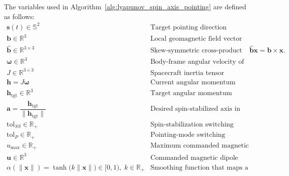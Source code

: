 \documentclass[conference,onecolumn,draftclsnofoot]{IEEEtran}
\begin{document}
The variables used in Algorithm~\ref{alg:lyapunov_spin_axis_pointing}
are defined as follows:
\[
\begin{array}{ll}
\mathbf{s}(t) \in \mathbb{S}^{2}
&
\text{Target pointing direction expressed in the body frame.}
\\[0.4em]

\mathbf{b} \in \mathbb{R}^{3}
&
\text{Local geomagnetic field vector expressed in the body frame.}
\\[0.4em]

\hat{\mathbf b} \in \mathbb{R}^{3 \times 3}
&
\text{Skew-symmetric cross-product matrix that satisfies }
\hat{\mathbf b}\mathbf{x} = \mathbf{b} \times \mathbf{x}.
\\[0.4em]

\boldsymbol{\omega} \in \mathbb{R}^{3}
&
\text{Body-frame angular velocity of the spacecraft.}
\\[0.4em]

J \in \mathbb{R}^{3 \times 3}
&
\text{Spacecraft inertia tensor expressed in the body frame.}
\\[0.4em]

\mathbf{h} = J\boldsymbol{\omega}
&
\text{Current angular momentum expressed in the body frame.}
\\[0.4em]

\mathbf{h}_{\mathrm{tgt}} \in \mathbb{R}^{3}
&
\text{Target angular momentum expressed in the body frame.}
\\[0.4em]

\mathbf{a}
=
\dfrac{\mathbf{h}_{\mathrm{tgt}}}
{\|\mathbf{h}_{\mathrm{tgt}}\|}
&
\text{Desired spin-stabilized axis in the body frame.}
\\[1.0em]

\mathrm{tol}_{SS} \in \mathbb{R}_{+}
&
\text{Spin-stabilization switching tolerance.}
\\[0.4em]

\mathrm{tol}_{P} \in \mathbb{R}_{+}
&
\text{Pointing-mode switching tolerance.}
\\[0.4em]

u_{\max} \in \mathbb{R}_{+}
&
\text{Maximum commanded magnetic dipole magnitude.}
\\[0.4em]

\boldsymbol{u} \in \mathbb{R}^{3}
&
\text{Commanded magnetic dipole moment in the body frame.}
\\[0.4em]

\alpha(\|\mathbf{x}\|) = \tanh\big(k\|\mathbf{x}\|\big) \in [0,1),\; k \in \mathbb{R}_{+}
&
\text{Smoothing function that maps a nonnegative command magnitude to [0,1).}
\end{array}
\]
\end{document}
